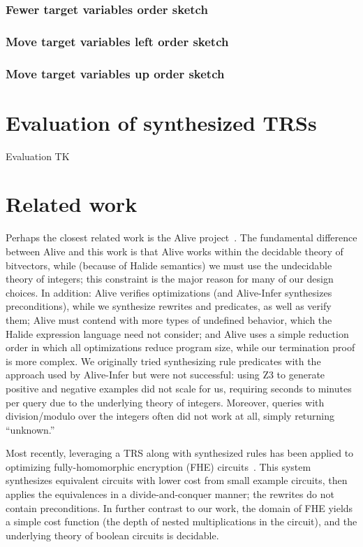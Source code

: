 \subsubsection{Fewer target variables order sketch}

\subsubsection{Move target variables left order sketch}

\subsubsection{Move target variables up order sketch}

\section{Evaluation of synthesized TRSs}

Evaluation TK


\section{Related work}
\label{sec:related}

Perhaps the closest related work is the Alive project~\cite{lopes2015alive,menendez2017aliveinfer}.
The fundamental difference between Alive and this
work is that Alive works within the decidable theory of bitvectors, while
(because of Halide semantics) we must use the undecidable theory of integers;
this constraint is the major reason for many of our design choices. In addition:
Alive verifies optimizations (and Alive-Infer synthesizes preconditions), while
we synthesize rewrites and predicates, as well as verify them; Alive must contend
with more types of undefined behavior, which the Halide expression
language need not consider; and Alive uses a simple reduction order in
which all optimizations reduce program size, while our termination proof is more
complex. We originally tried synthesizing rule predicates with the approach used
by Alive-Infer but were not successful: using Z3 to generate positive and
negative examples did not scale for us, requiring seconds to minutes per query
due to the underlying theory of integers.  Moreover, queries with
division/modulo over the integers often did not work at all, simply returning
``unknown.''

Most recently, leveraging a TRS along with synthesized rules has been applied
to optimizing fully-homomorphic encryption (FHE) circuits~\cite{lee2020fhe}.  This
system synthesizes equivalent circuits with lower cost from small example circuits,
then applies the equivalences in a divide-and-conquer manner; the rewrites do
not contain preconditions. In further contrast to our work, the domain of FHE yields a
simple cost function (the depth of nested multiplications in the circuit), and
the underlying theory of boolean circuits is decidable.

